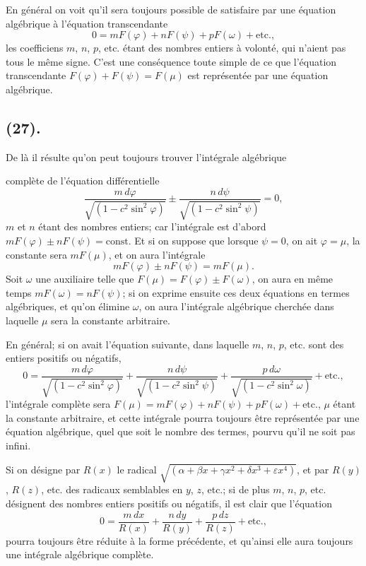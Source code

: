 \documentclass{article}
\begin{document}
En général on voit qu'il sera toujours possible de satisfaire par une équation algébrique à l'équation transcendante
\[ 0=mF(\varphi)+nF(\psi)+pF(\omega)+\text{etc.}, \]
les coefficiens $m$, $n$, $p$, etc. étant des nombres entiers à volonté, qui n'aient pas tous le même signe. C'est une conséquence toute simple de ce que l'équation transcendante $F(\varphi)+F(\psi)=F(\mu)$ est représentée par une équation algébrique.

\subsection*{(27).}

De là il résulte qu'on peut toujours trouver l'intégrale algébrique

complète de l'équation différentielle
\[ \frac{m\,d\varphi}{\sqrt{(1-c^{2}\sin^{2}\varphi)}}\pm\frac{n\,d\psi}{\sqrt{(1-c^{2}\sin^{2}\psi)}}=0, \]
$m$ et $n$ étant des nombres entiers; car l'intégrale est d'abord $mF(\varphi)\pm nF(\psi)=\text{const.}$ Et si on suppose que lorsque $\psi=0$, on ait $\varphi=\mu$, la constante sera $mF(\mu)$, et on aura l'intégrale
\[ mF(\varphi)\pm nF(\psi)=mF(\mu). \]
Soit $\omega$ une auxiliaire telle que $F(\mu)=F(\varphi)\pm F(\omega)$, on aura en même temps $mF(\omega)=nF(\psi)$; si on exprime ensuite ces deux équations en termes algébriques, et qu'on élimine $\omega$, on aura l'intégrale algébrique cherchée dans laquelle $\mu$ sera la constante arbitraire.

En général; si on avait l'équation suivante, dans laquelle $m$, $n$, $p$, etc. sont des entiers positifs ou négatifs,
\[ 0=\frac{m\,d\varphi}{\sqrt{(1-c^{2}\sin^{2}\varphi)}}+\frac{n\,d\psi}{\sqrt{(1-c^{2}\sin^{2}\psi)}}+\frac{p\,d\omega}{\sqrt{(1-c^{2}\sin^{2}\omega)}}+\text{etc.}, \]
l'intégrale complète sera $F(\mu)=mF(\varphi)+nF(\psi)+pF(\omega)+\text{etc.}$, $\mu$ étant la constante arbitraire, et cette intégrale pourra toujours être représentée par une équation algébrique, quel que soit le nombre des termes, pourvu qu'il ne soit pas infini.

Si on désigne par $R(x)$ le radical $\sqrt{(\alpha+\beta x+\gamma x^{2}+\delta x^{3}+\varepsilon x^{4})}$, et par $R(y)$, $R(z)$, etc. des radicaux semblables en $y$, $z$, etc.; si de plus $m$, $n$, $p$, etc. désignent des nombres entiers positifs ou négatifs, il est clair que l'équation
\[ 0=\frac{m\,dx}{R(x)}+\frac{n\,dy}{R(y)}+\frac{p\,dz}{R(z)}+\text{etc.}, \]
pourra toujours être réduite à la forme précédente, et qu'ainsi elle aura toujours une intégrale algébrique complète.
\end{document}
